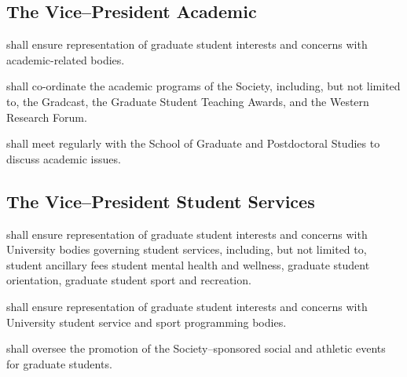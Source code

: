 \subsection {The Vice--President Academic} 
\begin{longenum}[ label*=\thesubsection.\arabic*., align=left]
	\item shall ensure representation of graduate student interests and concerns with academic-related bodies.
    \item shall co-ordinate the academic programs of the Society, including, but not limited to, the Gradcast, the Graduate Student Teaching Awards, and the Western Research Forum.
    \item shall meet regularly with the School of Graduate and Postdoctoral Studies to discuss academic issues.
    
\end{longenum}

\subsection {The Vice--President Student Services} 
\begin{longenum}[ label*=\thesubsection.\arabic*., align=left]
	\item shall ensure representation of graduate student interests and concerns with
	University bodies governing student services, including, but not limited to, student ancillary fees student mental health and wellness, graduate student orientation, graduate student sport and recreation.
    \item shall ensure representation of graduate student interests and concerns with University student service and sport programming bodies.
    \item shall oversee the promotion of the Society--sponsored social and athletic events for graduate students.
    
\end{longenum}

